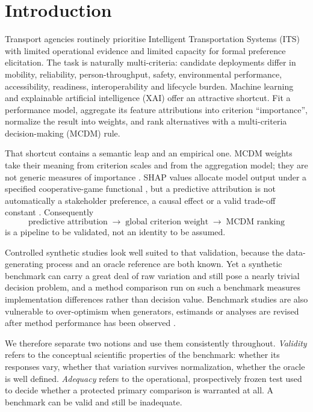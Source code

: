\documentclass[runningheads,orivec]{llncs}
\begin{document}
\section{Introduction}
\label{sec:introduction}

Transport agencies routinely prioritise Intelligent Transportation Systems (ITS) with
limited operational evidence and limited capacity for formal preference elicitation.
The task is naturally multi-criteria: candidate deployments differ in mobility,
reliability, person-throughput, safety, environmental performance, accessibility,
readiness, interoperability and lifecycle burden. Machine learning and explainable
artificial intelligence (XAI) offer an attractive shortcut. Fit a performance model,
aggregate its feature attributions into criterion ``importance'', normalize the result
into weights, and rank alternatives with a multi-criteria decision-making (MCDM) rule.

That shortcut contains a semantic leap and an empirical one. MCDM weights take their
meaning from criterion scales and from the aggregation model; they are not generic
measures of importance \cite{keeney1976decisions,roy1996importance,choo1999weights}.
SHAP values allocate model output under a specified cooperative-game functional
\cite{lundberg2017shap}, but a predictive attribution is not automatically a
stakeholder preference, a causal effect or a valid trade-off constant
\cite{sundararajan2020many,kumar2020shapleyproblems,janzing2020causal}. Consequently
\[
\text{predictive attribution}
\;\longrightarrow\;
\text{global criterion weight}
\;\longrightarrow\;
\text{MCDM ranking}
\]
is a pipeline to be validated, not an identity to be assumed.

Controlled synthetic studies look well suited to that validation, because the
data-generating process and an oracle reference are both known. Yet a synthetic
benchmark can carry a great deal of raw variation and still pose a nearly trivial
decision problem, and a method comparison run on such a benchmark measures
implementation differences rather than decision value. Benchmark studies are also
vulnerable to over-optimism when generators, estimands or analyses are revised after
method performance has been observed
\cite{morris2019simulation,niessl2022overoptimism}.

We therefore separate two notions and use them consistently throughout.
\emph{Validity} refers to the conceptual scientific properties of the benchmark:
whether its responses vary, whether that variation survives normalization, whether the
oracle is well defined. \emph{Adequacy} refers to the operational, prospectively frozen
test used to decide whether a protected primary comparison is warranted at all. A
benchmark can be valid and still be inadequate.
\end{document}
